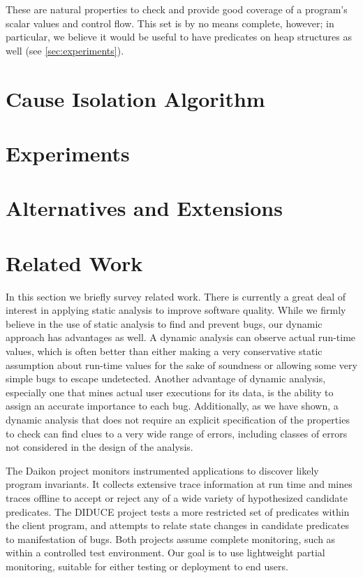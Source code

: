 \documentclass[final]{sigplanconf}
\begin{document}
These are natural properties to check and provide good coverage of a
program's scalar values and control flow.  This set is by no means
complete, however; in particular, we believe it would be useful to have
predicates on heap structures as well (see \autoref{sec:experiments}).

\section{Cause Isolation Algorithm}
\label{sec:algorithm}


\section{Experiments}
\label{sec:experiments}


\section{Alternatives and Extensions}
\label{sec:extensions}


\section{Related Work}
\label{sec:related-work}

In this section we briefly survey related work. There is currently a
great deal of interest in applying static analysis to improve software
quality.  While we firmly believe in the use of static analysis to
find and prevent bugs, our dynamic approach has advantages as well.  A dynamic
analysis can observe actual run-time values, which is often better
than either making a very conservative static assumption about run-time
values for the sake of soundness or allowing some very simple bugs to escape
undetected.  Another advantage of dynamic analysis, especially one
that mines actual user executions for its data, is the ability to
assign an accurate importance to each bug.  Additionally, as we have shown,
a dynamic analysis that does not require an explicit specification of
the properties to check can find clues to a very wide range of errors,
including classes of errors not considered in the design of the
analysis.

The Daikon project \cite{ernst2001} monitors instrumented applications
to discover likely program invariants.  It collects extensive trace
information at run time and mines traces offline to accept or reject any
of a wide variety of hypothesized candidate predicates.  The DIDUCE project
\cite{ICSE02*291} tests a more restricted set of predicates within the
client program, and attempts to relate state changes in candidate
predicates to manifestation of bugs.  Both projects assume complete
monitoring, such as within a controlled test environment.  Our goal is
to use lightweight partial monitoring, suitable for either testing
or deployment to end users.
\end{document}

